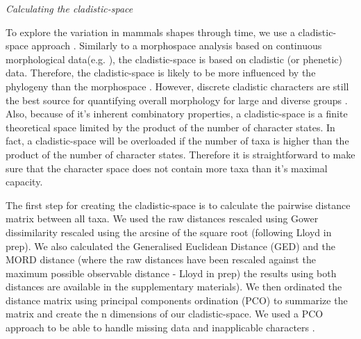 \documentclass[12pt,letterpaper]{article}
\renewcommand{\subsection}[1]{%
\bigskip
\begin{center}
\begin{large}
\normalfont\itshape #1
\end{large}
\end{center}}
\begin{document}
\subsection{Calculating the cladistic-space}
To explore the variation in mammals shapes through time, we use a cladistic-space approach \cite{Foote01071994,Foote29111996,Wesley-Hunt2005,Brusatte12092008,friedmanexplosive2010,toljagictriassic-jurassic2013}. Similarly to a morphospace analysis based on continuous morphological data(e.g. \cite{finlay2015morphological}), the cladistic-space is based on cladistic (or phenetic) data. Therefore, the cladistic-space is likely to be more influenced by the phylogeny than the morphospace \citep{Foote29111996,Wagner01011997}. However, discrete cladistic characters are still the best source for quantifying overall morphology for large and diverse groups \citep{Brusatte12092008}. Also, because of it's inherent combinatory properties, a cladistic-space is a finite theoretical space limited by the product of the number of character states. In fact, a cladistic-space will be overloaded if the number of taxa is higher than the product of the number of character states. Therefore it is straightforward to make sure that the character space does not contain more taxa than it's maximal capacity.

The first step for creating the cladistic-space is to calculate the pairwise distance matrix between all taxa. We used the raw distances rescaled using Gower \cite{Gower71} dissimilarity rescaled using the arcsine of the square root (following Lloyd in prep). We also calculated the Generalised Euclidean Distance (GED) \cite{Wills2001} and the MORD distance (where the raw distances have been rescaled against the maximum possible observable distance - Lloyd in prep) the results using both distances are available in the supplementary materials). We then ordinated the distance matrix using principal components ordination (PCO) to summarize the matrix and create the n dimensions of our cladistic-space. We used a PCO approach to be able to handle missing data and inapplicable characters \cite{lofgren2003,Wesley-Hunt2005}.
\end{document}
